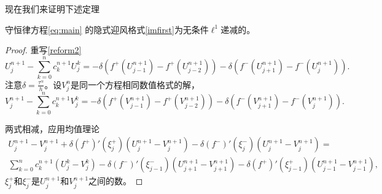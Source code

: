 现在我们来证明下述定理
\begin{thm}
守恒律方程\eqref{eq:main} 的隐式迎风格式\eqref{imfirst}为无条件$\ell^1$递减的。 
\end{thm}
\begin{proof}
重写\eqref{reform2}
\begin{equation}\label{reform3}
U_j^{n+1}-\sum_{k=0}^{n} c^{n+1}_k U_j^k= -\delta \left(f^+ (U_{j-1}^{n+1})- f^+(U_{j-2}^{n+1})\right) -\delta \left(f^-(U_{j+1}^{n+1})-f^-(U_j^{n+1})\right) .
\end{equation}
注意$\delta=\frac{\tau^\alpha}{h}$。设${V^n_j}$是同一个方程相同数值格式的解，
\begin{equation}\label{reform4}
V_j^{n+1}-\sum_{k=0}^{n} c^{n+1}_k V_j^k= -\delta \left(f^+ (V_{j-1}^{n+1})- f^+(V_{j-2}^{n+1})\right) -\delta \left(f^-(V_{j+1}^{n+1})-f^-(V_j^{n+1})\right) .
\end{equation}


两式相减，应用均值理论
\begin{multline*}
 U_j^{n+1} -V_{j}^{n+1} +\delta (f^+)'(\xi_j^+) \left(U^{n+1}_j-V^{n+1}_{j}\right) -  \delta (f^-)'(\xi_j^-)  \left(U^{n+1}_{j}-V^{n+1}_{j}\right) = \\
 \sum_{k=0}^{n} c^{n+1}_k \left( U_j^k- V_{j}^k\right) -  \delta (f^-)'(\xi_{j-1}^-)  \left(U^{n+1}_{j+1}-V^{n+1}_{j+1}\right)  -\delta (f^+)'(\xi_{j-1}^+)  \left(U^{n+1}_{j-1}-V^{n+1}_{j-1}\right),
 \end{multline*}
$\xi_j^+$和$\xi_j^-$是$U^{n+1}_j$和$V^{n+1}_j$之间的数。
 

\end{proof}
